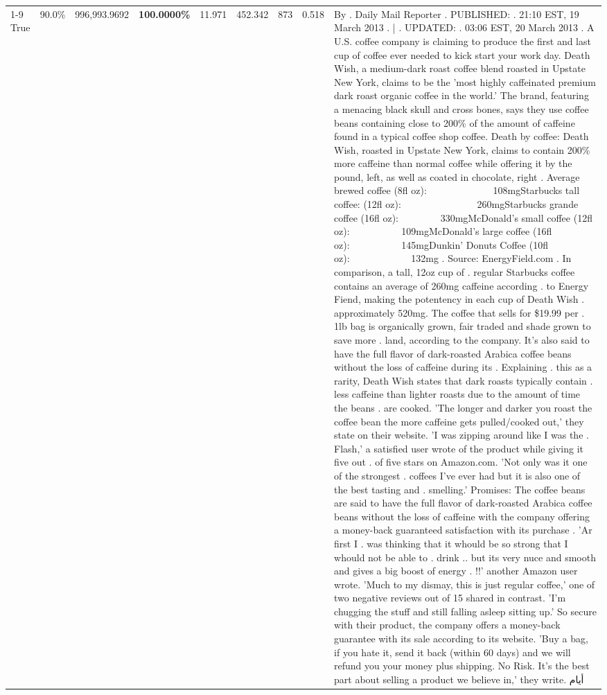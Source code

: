 \begin{table}[H]
{\begin{tabular}{lllrlllll}
\cline{1-9}
True & 90.0\% & 996,993.9692 & \bfseries \color{red} 100.0000\% & 11.971 & 452.342 & 873 & 0.518 & By . Daily Mail Reporter . PUBLISHED: . 21:10 EST, 19 March 2013 . | . UPDATED: . 03:06 EST, 20 March 2013 . A U.S. coffee company is claiming to produce the first and last cup of coffee ever needed to kick start your work day. Death Wish, a medium-dark roast coffee blend roasted in Upstate New York, claims to be the 'most highly caffeinated premium dark roast organic coffee in the world.' The brand, featuring a menacing black skull and cross bones, says they use coffee beans containing close to 200\% of the amount of caffeine found in a typical coffee shop coffee. Death by coffee: Death Wish, roasted in Upstate New York, claims to contain 200\% more caffeine than normal coffee while offering it by the pound, left, as well as coated in chocolate, right . Average brewed coffee (8fl oz):              108mgStarbucks tall coffee: (12fl oz):                260mgStarbucks grande coffee (16fl oz):         330mgMcDonald's small coffee (12fl oz):           109mgMcDonald's large coffee (16fl oz):           145mgDunkin' Donuts Coffee (10fl oz):             132mg . Source: EnergyField.com . In comparison, a tall, 12oz cup of . regular Starbucks coffee contains an average of 260mg caffeine according . to Energy Fiend, making the potentency in each cup of Death Wish . approximately 520mg. The coffee that sells for \$19.99 per . 1lb bag is organically grown, fair traded and shade grown to save more . land, according to the company. It's also said to have the full flavor of dark-roasted Arabica coffee beans without the loss of caffeine during its . Explaining . this as a rarity, Death Wish states that dark roasts typically contain . less caffeine than lighter roasts due to the amount of time the beans . are cooked. 'The longer and darker you roast the coffee bean the more caffeine gets pulled/cooked out,' they state on their website. 'I was zipping around like I was the . Flash,' a satisfied user wrote of the product while giving it five out . of five stars on Amazon.com. 'Not only was it one of the strongest . coffees I've ever had but it is also one of the best tasting and . smelling.’ Promises: The coffee beans are said to have the full flavor of dark-roasted Arabica coffee beans without the loss of caffeine with the company offering a money-back guaranteed satisfaction with its purchase . 'Ar first I . was thinking that it whould be so strong that I whould not be able to . drink .. but its very nuce and smooth and gives a big boost of energy . !!' another Amazon user wrote. 'Much to my dismay, this is just regular coffee,' one of two negative reviews out of 15 shared in contrast. 'I'm chugging the stuff and still falling asleep sitting up.' So secure with their product, the company offers a money-back guarantee with its sale according to its website. 'Buy a bag, if you hate it, send it back (within 60 days) and we will refund you your money plus shipping. No Risk. It’s the best part about selling a product we believe in,' they write. أيام \\

\end{tabular}}
\end{table}
